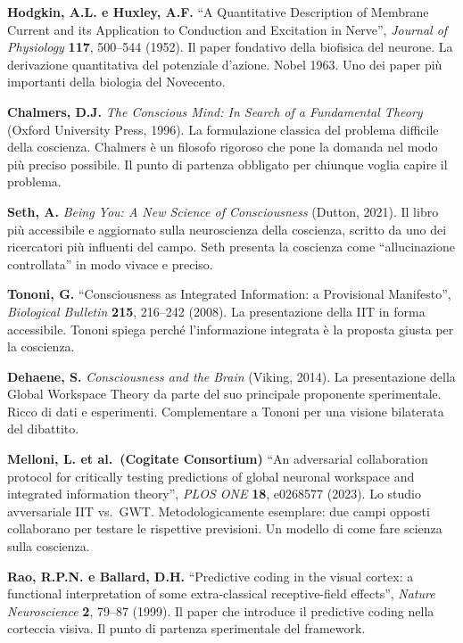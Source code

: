 \documentclass[11.5pt,a4paper,openany]{book}
\theoremstyle{remark}
\begin{document}
\textbf{Hodgkin, A.L. e Huxley, A.F.} ``A Quantitative Description of Membrane Current and its Application to Conduction and Excitation in Nerve'', \textit{Journal of Physiology} \textbf{117}, 500--544 (1952). Il paper fondativo della biofisica del neurone. La derivazione quantitativa del potenziale d'azione. Nobel 1963. Uno dei paper più importanti della biologia del Novecento.

\textbf{Chalmers, D.J.} \textit{The Conscious Mind: In Search of a Fundamental Theory} (Oxford University Press, 1996). La formulazione classica del problema difficile della coscienza. Chalmers è un filosofo rigoroso che pone la domanda nel modo più preciso possibile. Il punto di partenza obbligato per chiunque voglia capire il problema.

\textbf{Seth, A.} \textit{Being You: A New Science of Consciousness} (Dutton, 2021). Il libro più accessibile e aggiornato sulla neuroscienza della coscienza, scritto da uno dei ricercatori più influenti del campo. Seth presenta la coscienza come ``allucinazione controllata'' in modo vivace e preciso.

\textbf{Tononi, G.} ``Consciousness as Integrated Information: a Provisional Manifesto'', \textit{Biological Bulletin} \textbf{215}, 216--242 (2008). La presentazione della IIT in forma accessibile. Tononi spiega perché l'informazione integrata è la proposta giusta per la coscienza.

\textbf{Dehaene, S.} \textit{Consciousness and the Brain} (Viking, 2014). La presentazione della Global Workspace Theory da parte del suo principale proponente sperimentale. Ricco di dati e esperimenti. Complementare a Tononi per una visione bilaterata del dibattito.

\textbf{Melloni, L. et al.\ (Cogitate Consortium)} ``An adversarial collaboration protocol for critically testing predictions of global neuronal workspace and integrated information theory'', \textit{PLOS ONE} \textbf{18}, e0268577 (2023). Lo studio avversariale IIT vs.\ GWT. Metodologicamente esemplare: due campi opposti collaborano per testare le rispettive previsioni. Un modello di come fare scienza sulla coscienza.

\textbf{Rao, R.P.N. e Ballard, D.H.} ``Predictive coding in the visual cortex: a functional interpretation of some extra-classical receptive-field effects'', \textit{Nature Neuroscience} \textbf{2}, 79--87 (1999). Il paper che introduce il predictive coding nella corteccia visiva. Il punto di partenza sperimentale del framework.
\end{document}
